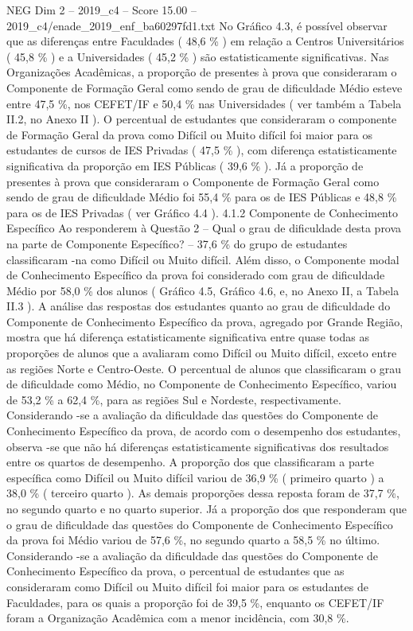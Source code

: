 \begin{textsample}{NEG Dim 2 – 2019\_c4 – Score 15.00 – 2019\_c4/enade\_2019\_enf\_ba60297fd1.txt}
No Gráfico 4.3, é possível observar que as diferenças entre Faculdades ( 48,6 \% ) em relação a Centros Universitários ( 45,8 \% ) e a Universidades ( 45,2 \% ) são estatisticamente significativas.
Nas Organizações Acadêmicas, a proporção de presentes à prova que consideraram o Componente de Formação Geral como sendo de grau de dificuldade Médio esteve entre 47,5 \%, nos CEFET/IF e 50,4 \% nas Universidades ( ver também a Tabela II.2, no Anexo II ).
O percentual de estudantes que consideraram o componente de Formação Geral da prova como Difícil ou Muito difícil foi maior para os estudantes de cursos de IES Privadas ( 47,5 \% ), com diferença estatisticamente significativa da proporção em IES Públicas ( 39,6 \% ).
Já a proporção de presentes à prova que consideraram o Componente de Formação Geral como sendo de grau de dificuldade Médio foi 55,4 \% para os de IES Públicas e 48,8 \% para os de IES Privadas ( ver Gráfico 4.4 ). 4.1.2 Componente de Conhecimento Específico Ao responderem à Questão 2 – Qual o grau de dificuldade desta prova na parte de Componente Específico? – 37,6 \% do grupo de estudantes classificaram -na como Difícil ou Muito difícil.
Além disso, o Componente modal de Conhecimento Específico da prova foi considerado com grau de dificuldade Médio por 58,0 \% dos alunos ( Gráfico 4.5, Gráfico 4.6, e, no Anexo II, a Tabela II.3 ).
A análise das respostas dos estudantes quanto ao grau de dificuldade do Componente de Conhecimento Específico da prova, agregado por Grande Região, mostra que há diferença estatisticamente significativa entre quase todas as proporções de alunos que a avaliaram como Difícil ou Muito difícil, exceto entre as regiões Norte e Centro-Oeste.
O percentual de alunos que classificaram o grau de dificuldade como Médio, no Componente de Conhecimento Específico, variou de 53,2 \% a 62,4 \%, para as regiões Sul e Nordeste, respectivamente.
Considerando -se a avaliação da dificuldade das questões do Componente de Conhecimento Específico da prova, de acordo com o desempenho dos estudantes, observa -se que não há diferenças estatisticamente significativas dos resultados entre os quartos de desempenho.
A proporção dos que classificaram a parte específica como Difícil ou Muito difícil variou de 36,9 \% ( primeiro quarto ) a 38,0 \% ( terceiro quarto ).
As demais proporções dessa reposta foram de 37,7 \%, no segundo quarto e no quarto superior.
Já a proporção dos que responderam que o grau de dificuldade das questões do Componente de Conhecimento Específico da prova foi Médio variou de 57,6 \%, no segundo quarto a 58,5 \% no último.
Considerando -se a avaliação da dificuldade das questões do Componente de Conhecimento Específico da prova, o percentual de estudantes que as consideraram como Difícil ou Muito difícil foi maior para os estudantes de Faculdades, para os quais a proporção foi de 39,5 \%, enquanto os CEFET/IF foram a Organização Acadêmica com a menor incidência, com 30,8 \%.

\end{textsample}
